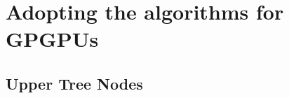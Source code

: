 







\section{Adopting the algorithms for GPGPUs}





\subsection{Upper Tree Nodes}\label{sec:upperNodes}




